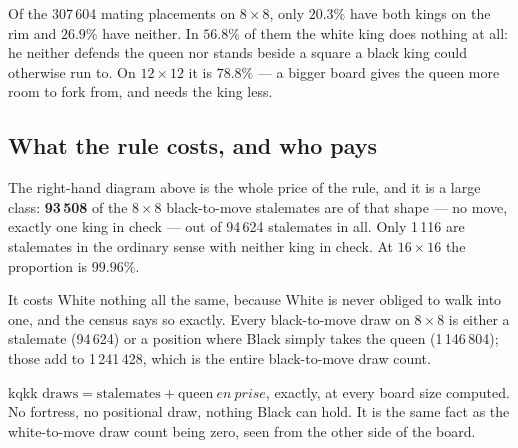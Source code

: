 \documentclass[11pt]{article}
\begin{document}

\medskip
\noindent
Of the 307\,604 mating placements on $8\times8$, only $20.3\%$ have both kings
on the rim and $26.9\%$ have neither. In $\mathbf{56.8\%}$ of them the white
king does nothing at all: he neither defends the queen nor stands beside a
square a black king could otherwise run to. On $12\times12$ it is $78.8\%$ ---
a bigger board gives the queen more room to fork from, and needs the king less.

\subsection{What the rule costs, and who pays}\label{sub:kqkk-cost}

The right-hand diagram above is the whole price of the rule, and it is a large
class: \textbf{93\,508} of the $8\times8$ black-to-move stalemates are of that
shape --- no move, exactly one king in check --- out of 94\,624 stalemates in
all. Only 1\,116 are stalemates in the ordinary sense with neither king in
check. At $16\times16$ the proportion is $99.96\%$.

It costs White nothing all the same, because White is never obliged to walk
into one, and the census says so exactly. Every black-to-move draw on
$8\times8$ is either a stalemate (94\,624) or a position where Black simply
takes the queen (1\,146\,804); those add to 1\,241\,428, which is the entire
black-to-move draw count.

\begin{result}[title={There is no third kind of draw}]{kqkk}
$\mathrm{draws} = \mathrm{stalemates} + \mathrm{queen}\ en\ prise$, exactly, at
every board size computed. No fortress, no positional draw, nothing Black can
hold. It is the same fact as the white-to-move draw count being zero, seen from
the other side of the board.
\end{result}
\end{document}
